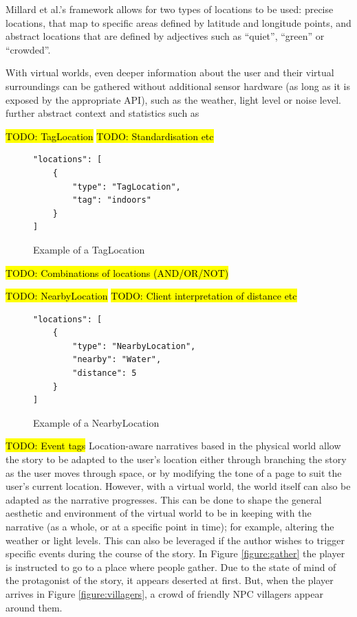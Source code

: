 \documentclass{acm}
\newcommand{\TODO}[1]{\hl{TODO: #1}}
\begin{document}
Millard et al.'s framework allows for two types of locations to be used: precise locations, that map to specific areas defined by latitude and longitude points, and abstract locations that are defined by adjectives such as ``quiet'', ``green'' or ``crowded''.

With virtual worlds, even deeper information about the user and their virtual surroundings can be gathered without additional sensor hardware (as long as it is exposed by the appropriate API), such as the weather, light level or noise level.
further abstract context and statistics such as

\TODO{TagLocation}
\TODO{Standardisation etc}
\begin{figure}
\centering
\begin{verbatim}
"locations": [
    {
        "type": "TagLocation",
        "tag": "indoors"
    }
]
\end{verbatim}

\caption{Example of a TagLocation}
\label{figure:nearbylocation}
\end{figure}
\TODO{Combinations of locations (AND/OR/NOT)}

\TODO{NearbyLocation}
\TODO{Client interpretation of distance etc}
\begin{figure}
\centering
\begin{verbatim}
"locations": [
    {
        "type": "NearbyLocation",
        "nearby": "Water",
        "distance": 5
    }
]
\end{verbatim}

\caption{Example of a NearbyLocation}
\label{figure:nearbylocation}
\end{figure}


\TODO{Event tags}
Location-aware narratives based in the physical world allow the story to be adapted to the user's location either through branching the story as the user moves through space, or by modifying the tone of a page to suit the user's current location. However, with a virtual world, the world itself can also be adapted as the narrative progresses. This can be done to shape the general aesthetic and environment of the virtual world to be in keeping with the narrative (as a whole, or at a specific point in time); for example, altering the weather or light levels.  This can also be leveraged if the author wishes to trigger specific events during the course of the story. In Figure \ref{figure:gather} the player is instructed to go to a place where people gather. Due to the state of mind of the protagonist of the story, it appears deserted at first. But, when the player arrives in Figure \ref{figure:villagers}, a crowd of friendly NPC villagers appear around them.
\end{document}
